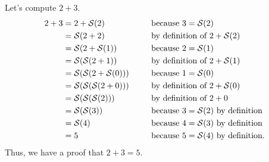 \begin{example}
    Let's compute \(2 + 3\).
    \begin{alignat*}{2}
        2 + 3 &= 2 + \successor{2} &&\text{ because } 3 = \successor{2}\\
              &= \successor{2 + 2} &&\text{ by definition of } 2 + \successor{2}\\
              &= \successor{2 + \successor{1}} &&\text{ because } 2 = \successor{1}\\
              &= \successor{\successor{2 + 1}} &&\text{ by definition of } 2 + \successor{1}\\
              &= \successor{\successor{2 + \successor{0}}} &&\text{ because } 1 = \successor{0}\\
              &= \successor{\successor{\successor{2 + 0}}}~~~~&&\text{ by definition of } 2 + \successor{0}\\
              &= \successor{\successor{\successor{2}}} &&\text{ by definition of } 2 + 0\\
              &= \successor{\successor{3}} &&\text{ because } 3 = \successor{2} \text{ by definition}\\
              &= \successor{4} &&\text{ because } 4 = \successor{3} \text{ by definition}\\
              &= 5 &&\text{ because } 5 = \successor{4} \text{ by definition}.
    \end{alignat*}
    Thus, we have a proof that \(2 + 3 = 5\).
\end{example}
